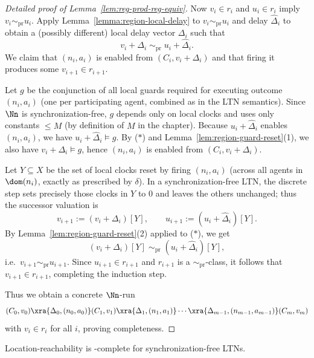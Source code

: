 \begin{proof}[Detailed proof of Lemma~\ref{lem:reg-prod-reg-equiv}]
Now $v_i\in r_i$ and $u_i\in r_i$ imply $v_i \sim_{\mathrm{pr}} u_i$.
Apply Lemma~\ref{lemma:region-local-delay} to $v_i \sim_{\mathrm{pr}} u_i$ and
delay $\widehat{\Delta}_i$ to obtain a (possibly different) local delay vector
$\Delta_i$ such that
\[
v_i+\Delta_i \;\sim_{\mathrm{pr}}\; u_i+\widehat{\Delta}_i. \tag{$\ast$}
\]
We claim that $(n_i,a_i)$ is enabled from $(C_i, v_i+\Delta_i)$ and that firing it
produces some $v_{i+1}\in r_{i+1}$.

Let $g$ be the conjunction of all local guards required for executing outcome
$(n_i,a_i)$ (one per participating agent, combined as in the LTN semantics).
Since $\Nn$ is synchronization-free, $g$ depends only on local clocks and uses
only constants $\le M$ (by definition of $M$ in the chapter).
Because $u_i+\widehat{\Delta}_i$ enables $(n_i,a_i)$, we have
$u_i+\widehat{\Delta}_i \models g$.
By ($\ast$) and Lemma~\ref{lem:region-guard-reset}(1), we also have
$v_i+\Delta_i \models g$, hence $(n_i,a_i)$ is enabled from $(C_i,v_i+\Delta_i)$.

Let $Y\subseteq X$ be the set of local clocks reset by firing $(n_i,a_i)$
(across all agents in $\dom(n_i)$, exactly as prescribed by $\delta$).
In a synchronization-free LTN, the discrete step sets precisely those clocks in
$Y$ to $0$ and leaves the others unchanged; thus the successor valuation is
\[
v_{i+1} := (v_i+\Delta_i)[Y], \qquad
u_{i+1} := (u_i+\widehat{\Delta}_i)[Y].
\]
By Lemma~\ref{lem:region-guard-reset}(2) applied to ($\ast$), we get
\[
(v_i+\Delta_i)[Y] \;\sim_{\mathrm{pr}}\; (u_i+\widehat{\Delta}_i)[Y],
\]
i.e.\ $v_{i+1} \sim_{\mathrm{pr}} u_{i+1}$.
Since $u_{i+1}\in r_{i+1}$ and $r_{i+1}$ is a $\sim_{\mathrm{pr}}$-class, it
follows that $v_{i+1}\in r_{i+1}$, completing the induction step.

\smallskip
Thus we obtain a concrete $\Nn$-run
\[
(C_0,v_0)\xra{\Delta_0,(n_0,a_0)}(C_1,v_1)\xra{\Delta_1,(n_1,a_1)}\cdots
\xra{\Delta_{m-1},(n_{m-1},a_{m-1})}(C_m,v_m)
\]
with $v_i\in r_i$ for all $i$, proving completeness.
\end{proof}

\begin{theorem}
\label{thm:pspace-syncfree}
Location-reachability is \PSPACE-complete for synchronization-free LTNs.
\end{theorem}

